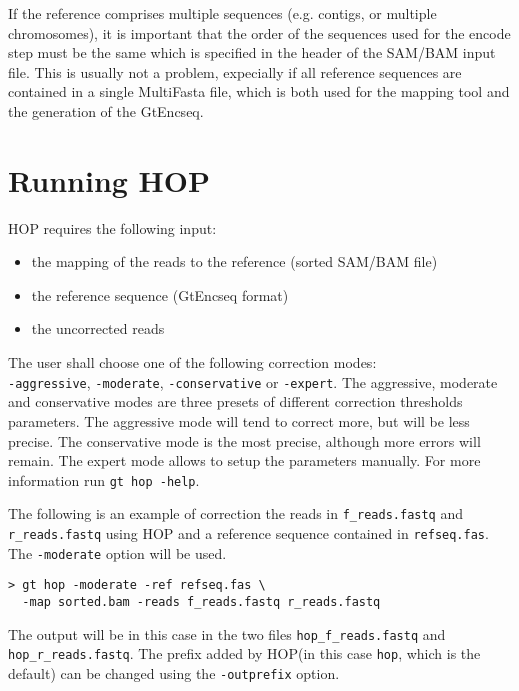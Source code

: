 \documentclass[12pt,titlepage]{article}
\newcommand{\Hop}{{HOP}\xspace}
\begin{document}
If the reference comprises multiple sequences (e.g. contigs,
or multiple chromosomes), it is important that the order of the sequences
used for the encode step must be the same which is specified in the header
of the SAM/BAM input file. This is usually not a problem, expecially
if all reference sequences are contained in a single MultiFasta file,
which is both used for the mapping tool and the generation of the GtEncseq.

\section{Running \Hop}

\Hop requires the following input:
\begin{itemize}
\item the mapping of the reads to the reference (sorted SAM/BAM file)
\item the reference sequence (GtEncseq format)
\item the uncorrected reads
\end{itemize}

The user shall choose one of the following correction modes:\\
\texttt{-aggressive},
\texttt{-moderate},
\texttt{-conservative} or
\texttt{-expert}.
The aggressive, moderate and conservative modes are three presets
of different correction thresholds parameters. The aggressive mode
will tend to correct more, but will be less precise. The conservative
mode is the most precise, although more errors will remain.
The expert mode allows to setup the parameters manually. For more
information run \texttt{gt hop -help}.

The following is an example of correction the reads in
\texttt{f\_reads.fastq} and \texttt{r\_reads.fastq} using \Hop
and a reference sequence contained in \texttt{refseq.fas}.
The \texttt{-moderate} option will be used.

\begin{footnotesize}
\begin{verbatim}
> gt hop -moderate -ref refseq.fas \
  -map sorted.bam -reads f_reads.fastq r_reads.fastq
\end{verbatim}
\end{footnotesize}

The output will be in this case in the two files
\texttt{hop\_f\_reads.fastq} and \texttt{hop\_r\_reads.fastq}.
The prefix added by \Hop (in this case \texttt{hop},
which is the default) can be changed using the \texttt{-outprefix}
option.
\end{document}
